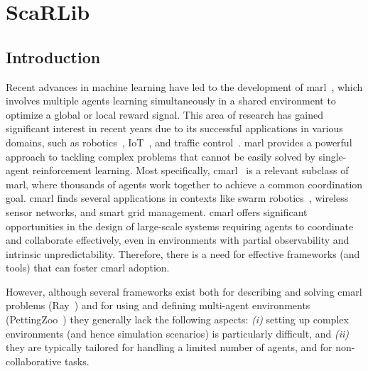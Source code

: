 %

%
%


\lstset{language=scafi}
%
%
\chapter{ScaRLib}%
%
\newcommand{\meta}[1]{{\color{blue} #1}}%
\newcommand{\scarlib}{ScaRLib}
%
\acresetall
\section{Introduction}
Recent advances in machine learning 
 have led to the development of \ac{marl}~\cite{Busoniu2008}, 
 which involves multiple agents learning simultaneously 
 in a shared environment to optimize a global or local reward signal. 
% 
This area of research has gained significant interest in recent years 
 due to its successful applications in various domains, 
 such as robotics~\cite{Long2018}, IoT~\cite{Lei2020}, and traffic control~\cite{https://doi.org/10.48550/arxiv.1903.04527}. 
%
\ac{marl} provides a powerful approach to tackling complex problems 
 that cannot be easily solved by single-agent reinforcement learning. 
%
Most specifically, \ac{cmarl}~\cite{yang2021many,https://doi.org/10.48550/arxiv.2106.09825}
 is a relevant subclass of \ac{marl}, 
 where thousands of agents work together to achieve a common coordination goal. 
\ac{cmarl} finds several applications in contexts like swarm robotics~\cite{huttenrauch2019deep}, wireless sensor networks, and smart grid management. 
%
\ac{cmarl} offers significant opportunities in the design of large-scale systems
 requiring agents to coordinate and collaborate effectively, 
 even in environments with partial observability and intrinsic unpredictability. 
%
Therefore, there is a need for effective frameworks (and tools) that can foster \ac{cmarl} adoption.

% 
However, although several frameworks exist both for describing and solving \ac{cmarl} problems (Ray~\cite{ray}) 
and for using and defining multi-agent environments (PettingZoo~\cite{NEURIPS2021_7ed2d345}) 
they generally lack the following aspects: \emph{(i)} setting up complex environments (and hence simulation scenarios) is particularly difficult, and 
\emph{(ii)} they are typically tailored for handling a limited number of agents, and for non-collaborative tasks.

